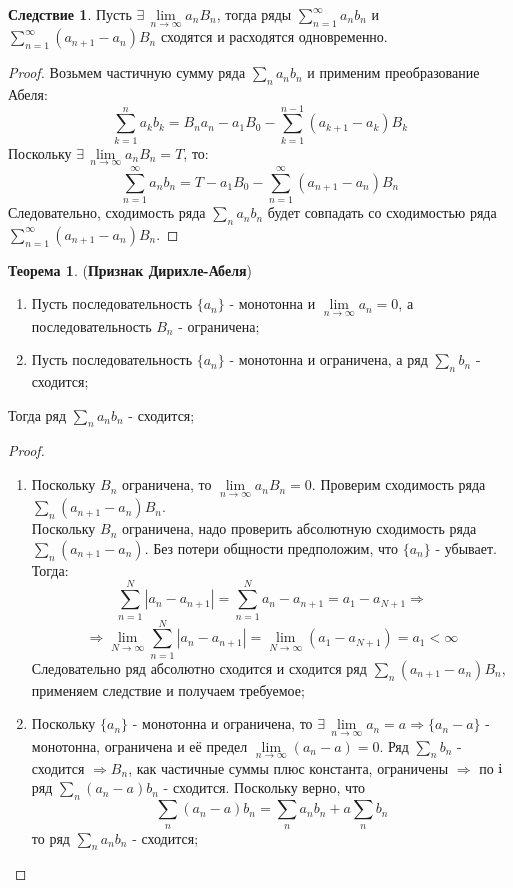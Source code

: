 \documentclass[12pt]{article}
\newcommand{\RN}[1]{%
	\textup{\uppercase\expandafter{\romannumeral#1}}%
}
\theoremstyle{definition}
\newtheorem{theorem}{Теорема}
\newtheorem{corollary}{Следствие}
\begin{document}
\begin{corollary}
	Пусть $\exists \, \lim\limits_{n\to \infty} a_n B_n$, тогда ряды $\displaystyle \sum\limits_{n = 1}^{\infty} a_n b_n$ и $\displaystyle \sum\limits_{n = 1}^{\infty} (a_{n+1} - a_n)B_n$ сходятся и расходятся одновременно.
\end{corollary}
\begin{proof}
	Возьмем частичную сумму ряда $\displaystyle \sum\limits_{n}a_nb_n$ и применим преобразование Абеля:
	$$
		\sum\limits_{k = 1}^n a_k b_k = B_n a_n - a_1 B_0 - \sum\limits_{k = 1}^{n-1} (a_{k+1} - a_k)B_k 
	$$
	Поскольку $\exists \, \lim\limits_{n\to \infty} a_n B_n = T$, то:
	$$
		\sum\limits_{n = 1}^{\infty} a_n b_n = T - a_1 B_0 - \sum\limits_{n = 1}^{\infty} (a_{n+1} - a_n)B_n
	$$
	Следовательно, сходимость ряда $\displaystyle \sum\limits_n a_n b_n$ будет совпадать со сходимостью ряда $\displaystyle \sum\limits_{n = 1}^{\infty} (a_{n+1} - a_n)B_n$.
\end{proof}
\begin{theorem}(\textbf{Признак Дирихле-Абеля})
	\begin{enumerate}[label ={\Roman*.}]
		\item Пусть последовательность $\{a_n\}$ - монотонна и $\lim\limits_{n \to \infty}a_n = 0$, а последовательность $B_n$ - ограничена; 
		\item Пусть последовательность $\{a_n\}$ - монотонна и ограничена, а ряд $\displaystyle\sum\limits_n b_n$ - сходится;
	\end{enumerate}
	Тогда ряд $\displaystyle\sum\limits_n a_n b_n$ - сходится;
\end{theorem}
\begin{proof}\hfill
	\begin{enumerate}[label ={\Roman*.}]
		\item Поскольку $B_n$ ограничена, то $\lim\limits_{n \to \infty}a_nB_n = 0$. Проверим сходимость ряда $\displaystyle \sum\limits_n (a_{n+1} - a_n)B_n$. \\
		Поскольку $B_n$ ограничена, надо проверить абсолютную сходимость ряда $\displaystyle \sum\limits_n (a_{n+1} - a_n)$. Без потери общности предположим, что $\{a_n\}$ - убывает. Тогда:
		$$
			\sum\limits_{n = 1}^N |a_n - a_{n+1}| = \sum\limits_{n = 1}^N a_n - a_{n+1} = a_1 - a_{N+1} \Rightarrow 
		$$
		$$
			\Rightarrow \lim\limits_{N \to \infty}\sum\limits_{n = 1}^N |a_n - a_{n+1}| =  \lim\limits_{N \to \infty}(a_1 - a_{N+1}) = a_1 < \infty
		$$
		Следовательно ряд абсолютно сходится и сходится ряд $\displaystyle \sum\limits_n (a_{n+1} - a_n)B_n$, применяем следствие и получаем требуемое;
		\item Поскольку $\{a_n\}$ - монотонна и ограничена, то $\exists \, \lim\limits_{n \to \infty}a_n = a \Rightarrow \{a_n - a\}$ - монотонна, ограничена и её предел $\lim\limits_{n \to \infty}(a_n - a) = 0$. Ряд $\displaystyle\sum\limits_n b_n$ - сходится $\Rightarrow B_n$, как частичные суммы плюс константа, ограничены $\Rightarrow$ по $\RN{1}$ ряд $\displaystyle\sum\limits_n (a_n - a) b_n$ - сходится. Поскольку верно, что 
		$$
			\sum\limits_n (a_n - a) b_n = \sum\limits_n a_n b_n + a\sum\limits_n  b_n
		$$
		то ряд $\sum\limits_n a_n b_n$ - сходится;
	\end{enumerate}
\end{proof}
\end{document}
